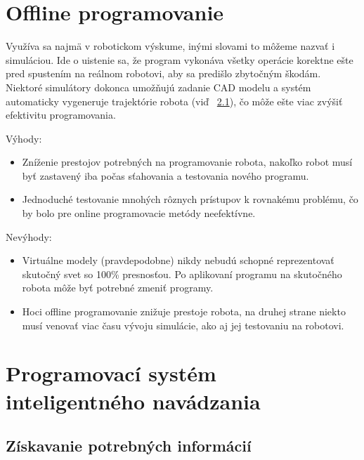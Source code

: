 \documentclass[10pt,twoside,slovak,a4paper]{article}
\begin{document}
\section{Offline programovanie} \label{off} %

Využíva sa najmä v robotickom výskume, inými slovami to môžeme nazvať i simuláciou. Ide o uistenie sa, že program vykonáva všetky operácie korektne ešte pred spustením na reálnom robotovi, aby sa predišlo zbytočným škodám. Niektoré simulátory dokonca umožňujú zadanie CAD modelu a systém automaticky vygeneruje trajektórie robota (viď ~\ref{AIsys:getinfo}), čo môže ešte viac zvýšiť efektivitu programovania.\cite{hlavny_zdroj} \newline

Výhody:
\begin{itemize}
\item Zníženie prestojov potrebných na programovanie robota, nakoľko robot musí byť zastavený iba počas sťahovania a testovania nového programu. 
\item Jednoduché testovanie mnohých rôznych prístupov k rovnakému problému, čo by bolo pre online programovacie metódy neefektívne.
\end{itemize}

Nevýhody:
\begin{itemize}
\item Virtuálne modely (pravdepodobne) nikdy nebudú schopné reprezentovať skutočný svet so 100\% presnosťou. Po aplikovaní programu na skutočného robota môže byť potrebné zmeniť programy.
\item Hoci offline programovanie znižuje prestoje robota, na druhej strane niekto musí venovať viac času vývoju simulácie, ako aj jej testovaniu na robotovi. 
\end{itemize}

\cite{off_pros_cons}

\section{Programovací systém inteligentného navádzania} \label{AIsys} %

\cite{hlavny_zdroj}

\subsection{Získavanie potrebných informácií} \label{AIsys:getinfo} %
\end{document}
